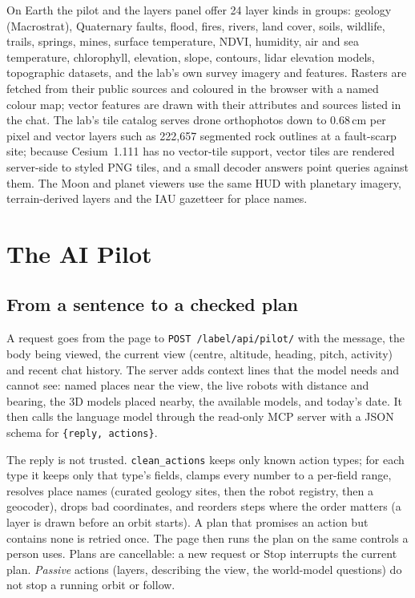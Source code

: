 \documentclass[journal]{IEEEtran}
\newcommand{\code}[1]{\texttt{#1}}
\begin{document}
On Earth the pilot and the layers panel offer 24 layer kinds in groups: geology (Macrostrat),
Quaternary faults, flood, fires, rivers, land cover, soils, wildlife, trails, springs, mines,
surface temperature, NDVI, humidity, air and sea temperature, chlorophyll, elevation, slope,
contours, lidar elevation models, topographic datasets, and the lab's own survey imagery and
features. Rasters are fetched from their public sources and coloured in the browser with a named
colour map; vector features are drawn with their attributes and sources listed in the chat. The
lab's tile catalog serves drone orthophotos down to 0.68\,cm per pixel and vector layers such as
222{,}657 segmented rock outlines at a fault-scarp site; because Cesium~1.111 has no vector-tile
support, vector tiles are rendered server-side to styled PNG tiles, and a small decoder answers
point queries against them. The Moon and planet viewers use the same HUD with planetary imagery,
terrain-derived layers and the IAU gazetteer for place names.

\section{The AI Pilot}
\label{sec:pilot}

\subsection{From a sentence to a checked plan}
A request goes from the page to \code{POST /label/api/pilot/} with the message, the body being
viewed, the current view (centre, altitude, heading, pitch, activity) and recent chat history. The
server adds context lines that the model needs and cannot see: named places near the view, the
live robots with distance and bearing, the 3D models placed nearby, the available models, and
today's date. It then calls the language model through the read-only MCP server with a JSON
schema for \code{\{reply, actions\}}.

The reply is not trusted. \code{clean\_actions} keeps only known action types; for each type it
keeps only that type's fields, clamps every number to a per-field range, resolves place names
(curated geology sites, then the robot registry, then a geocoder), drops bad coordinates, and
reorders steps where the order matters (a layer is drawn before an orbit starts). A plan that
promises an action but contains none is retried once. The page then runs the plan on the
same controls a person uses. Plans are cancellable: a new request or Stop interrupts the current
plan. \emph{Passive} actions (layers, describing the view, the world-model questions) do not stop
a running orbit or follow.
\end{document}
